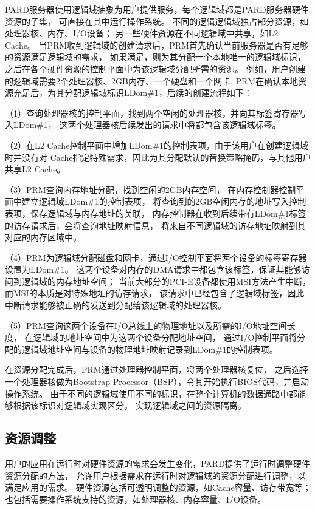 PARD服务器使用逻辑域抽象为用户提供服务，每个逻辑域都是PARD服务器硬件资源的子集，
可直接在其中运行操作系统。
不同的逻辑逻辑域独占部分资源，如处理器核、内存、I/O设备；
另一些硬件资源在不同逻辑域中共享，如L2 Cache。
当PRM收到逻辑域的创建请求后，PRM首先确认当前服务器是否有足够的资源满足逻辑域的需求，
如果满足，则为其分配一个本地唯一的逻辑域标识，
之后在各个硬件资源的控制平面中为该逻辑域分配所需的资源。
例如，用户创建的逻辑域需要2个处理器核、2GB内存、一个硬盘和一个网卡,
PRM在确认本地资源充足后，为其分配逻辑域标识LDom\#1，后续的创建流程如下：

（1）查询处理器核的控制平面，找到两个空闲的处理器核，并向其标签寄存器写入LDom\#1，
这两个处理器核后续发出的请求中将都包含该逻辑域标签。

（2）在L2 Cache控制平面中增加LDom\#1的控制表项，由于该用户在创建逻辑域时并没有对
Cache指定特殊需求，因此为其分配默认的替换策略掩码，与其他用户共享L2 Cache。

（3）PRM查询内存地址分配，找到空闲的2GB内存空间，
在内存控制器控制平面中建立逻辑域LDom\#1的控制表项，
将查询到的2GB空闲内存的地址写入控制表项，保存逻辑域与内存地址的关联，
内存控制器在收到后续带有LDom\#1标签的访存请求后，会将查询地址映射信息，
将来自不同逻辑域的访存地址映射到其对应的内存区域中。

（4）PRM为逻辑域分配磁盘和网卡，通过I/O控制平面将两个设备的标签寄存器设置为LDom\#1。
这两个设备对内存的DMA请求中都包含该标签，保证其能够访问到逻辑域的内存地址空间；
当前大部分的PCI-E设备都使用MSI方法产生中断，而MSI的本质是对特殊地址的访存请求，
该请求中已经包含了逻辑域标签，因此中断请求能够被正确的发送到分配给该逻辑域的处理器核。

（5）PRM查询这两个设备在I/O总线上的物理地址以及所需的I/O地址空间长度，
在逻辑域的地址空间中为这两个设备分配地址空间，
通过I/O控制平面将分配的逻辑域地址空间与设备的物理地址映射记录到LDom\#1的控制表项。

在资源分配完成后，PRM通过处理器控制平面，将两个处理器核复位，
之后选择一个处理器核做为Bootstrap Processor（BSP），令其开始执行BIOS代码，并启动操作系统。
由于不同的逻辑域使用不同的标识，在整个计算机的数据通路中都能够根据该标识对逻辑域实现区分，
实现逻辑域之间的资源隔离。


\subsection{资源调整}

用户的应用在运行时对硬件资源的需求会发生变化，PARD提供了运行时调整硬件资源分配的方法，
允许用户根据需求在运行时对逻辑域的资源分配进行调整，以满足应用的需求。
硬件资源包括可透明调整的资源，如Cache容量、访存带宽等；
也包括需要操作系统支持的资源，如处理器核、内存容量、I/O设备。

